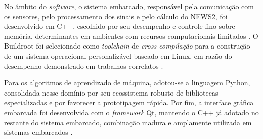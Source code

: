 

No âmbito do \textit{software}, o sistema embarcado, responsável pela comunicação com os sensores, pelo processamento dos sinais e pelo cálculo do NEWS2, foi desenvolvido em C++, escolhido por seu desempenho e controle fino sobre memória, determinantes em ambientes com recursos computacionais limitados \cite{knuttila2012functional}. O Buildroot foi selecionado como \textit{toolchain} de \textit{cross-compilação} para a construção de um sistema operacional personalizável baseado em Linux, em razão do desempenho demonstrado em trabalhos correlatos \cite{ozturk2023}.

Para os algoritmos de aprendizado de máquina, adotou-se a linguagem Python, consolidada nesse domínio por seu ecossistema robusto de bibliotecas especializadas e por favorecer a prototipagem rápida. Por fim, a interface gráfica embarcada foi desenvolvida com o \textit{framework} Qt, mantendo o C++ já adotado no restante do sistema embarcado, combinação madura e amplamente utilizada em sistemas embarcados \cite{qtAbout}.



